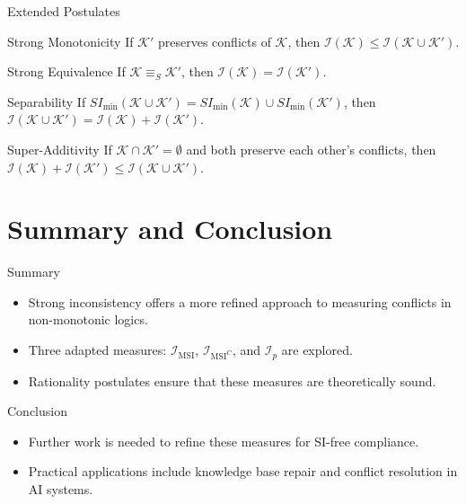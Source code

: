 \begin{frame}{Extended Postulates}
    \begin{block}{Strong Monotonicity}
        If \( \mathcal{K}' \) preserves conflicts of \( \mathcal{K} \), then \( \mathcal{I}(\mathcal{K}) \leq \mathcal{I}(\mathcal{K} \cup \mathcal{K}') \).
    \end{block}

    \begin{block}{Strong Equivalence}
        If \( \mathcal{K} \equiv_S \mathcal{K}' \), then \( \mathcal{I}(\mathcal{K}) = \mathcal{I}(\mathcal{K}') \).
    \end{block}

    \begin{block}{Separability}
        If \( SI_{\min}(\mathcal{K} \cup \mathcal{K}') = SI_{\min}(\mathcal{K}) \cup SI_{\min}(\mathcal{K}') \), then \( \mathcal{I}(\mathcal{K} \cup \mathcal{K}') = \mathcal{I}(\mathcal{K}) + \mathcal{I}(\mathcal{K}') \).
    \end{block}

    \begin{block}{Super-Additivity}
        If \( \mathcal{K} \cap \mathcal{K}' = \emptyset \) and both preserve each other's conflicts, then \( \mathcal{I}(\mathcal{K}) + \mathcal{I}(\mathcal{K}') \leq \mathcal{I}(\mathcal{K} \cup \mathcal{K}') \).
    \end{block}
\end{frame}

\section{Summary and Conclusion}

\begin{frame}{Summary}
    \begin{itemize}
        \item Strong inconsistency offers a more refined approach to measuring conflicts in non-monotonic logics.
        \item Three adapted measures: \(\mathcal{I}_{\text{MSI}}\), \(\mathcal{I}_{\text{MSI}^C}\), and \(\mathcal{I}_p\) are explored.
        \item Rationality postulates ensure that these measures are theoretically sound.
    \end{itemize}
\end{frame}

\begin{frame}{Conclusion}
    \begin{itemize}
        \item Further work is needed to refine these measures for SI-free compliance.
        \item Practical applications include knowledge base repair and conflict resolution in AI systems.
    \end{itemize}
\end{frame}
